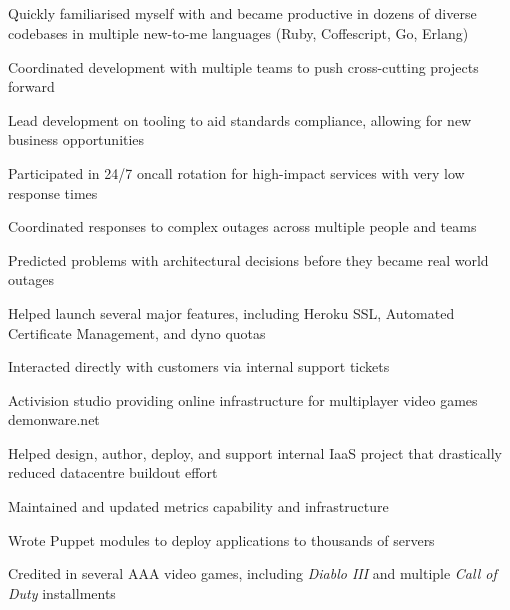 \documentclass[letterpaper,11pt,notitlepage]{article}
\begin{document}

\vbar
{}
         \\
         \\
         \\
         \\
        \begin{employment}
            \item Quickly familiarised myself with and became productive in
              dozens of diverse codebases in multiple new-to-me languages (Ruby,
              Coffescript, Go, Erlang)
            \item Coordinated development with multiple teams to push
              cross-cutting projects forward
            \item Lead development on tooling to aid standards compliance,
                  allowing for new business opportunities
            \item Participated in 24/7 oncall rotation for high-impact services with
                  very low response times
            \item Coordinated responses to complex outages across multiple people
              and teams
            \item Predicted problems with architectural decisions before they
              became real world outages
            \item Helped launch several major features, including Heroku
              SSL, Automated Certificate Management, and dyno quotas
            \item Interacted directly with customers via internal support
              tickets
        \end{employment}
    \companydescurl
       {Activision studio providing online infrastructure for multiplayer video
         games}
       {demonware.net} \\
        \begin{employment}
            \item Helped design, author, deploy, and support internal IaaS
                  project that drastically reduced datacentre buildout effort
            \item Maintained and updated metrics capability and infrastructure
            \item Wrote Puppet modules to deploy applications to thousands of servers
            \item Credited in several AAA video games, including
              {\it Diablo III} and multiple {\it Call of Duty} installments
        \end{employment}
\end{document}
